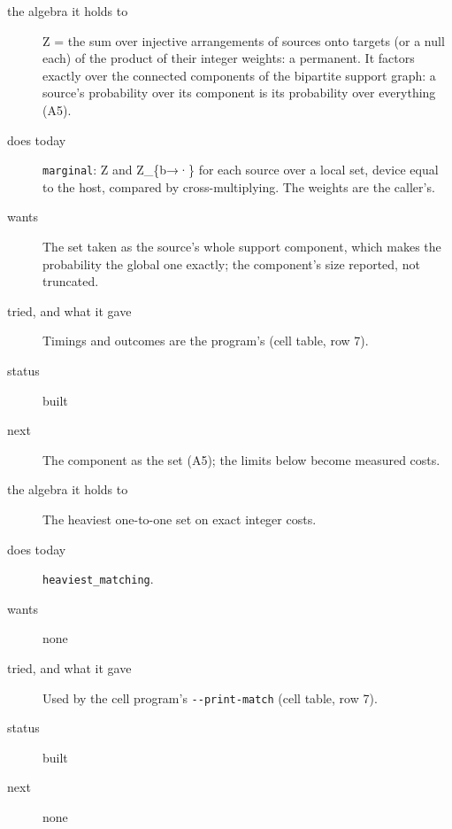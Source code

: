 \begin{description}
\item[{the algebra it holds to}] Z = the sum over injective arrangements of sources onto targets (or a null each) of the product of their integer weights: a permanent. It factors exactly over the connected components of the bipartite support graph: a source's probability over its component is its probability over everything (A5).
\item[{does today}] \texttt{marginal}: Z and Z\_\allowbreak{}\{b→·\} for each source over a local set, device equal to the host, compared by cross-multiplying. The weights are the caller's.
\item[{wants}] The set taken as the source's whole support component, which makes the probability the global one exactly; the component's size reported, not truncated.
\item[{tried, and what it gave}] Timings and outcomes are the program's (cell table, row 7).
\item[{status}] built
\item[{next}] The component as the set (A5); the limits below become measured costs.
\end{description}

\begin{description}
\item[{the algebra it holds to}] The heaviest one-to-one set on exact integer costs.
\item[{does today}] \texttt{heaviest\_\allowbreak{}matching}.
\item[{wants}] none
\item[{tried, and what it gave}] Used by the cell program's \texttt{-\allowbreak{}-\allowbreak{}print-\allowbreak{}match} (cell table, row 7).
\item[{status}] built
\item[{next}] none
\end{description}


